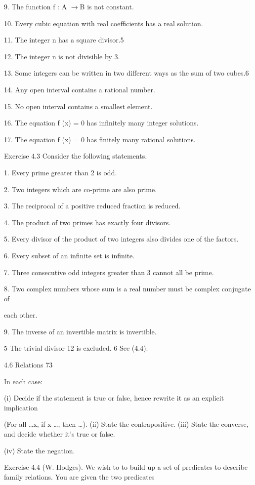 \documentclass[11pt]{article}
\theoremstyle{plain}
\theoremstyle{definition}
\begin{document}
9. The function f : A $\to$B is not constant.

10. Every cubic equation with real coefficients has a real solution.

11. The integer n has a square divisor.5

12. The integer n is not divisible by 3.

13. Some integers can be written in two different ways as the sum of two cubes.6

14. Any open interval contains a rational number.

15. No open interval contains a smallest element.

16. The equation f (x) = 0 has infinitely many integer solutions.

17. The equation f (x) = 0 has finitely many rational solutions.

Exercise 4.3 Consider the following statements.

1. Every prime greater than 2 is odd.

2. Two integers which are co-prime are also prime.

3. The reciprocal of a positive reduced fraction is reduced.

4. The product of two primes has exactly four divisors.

5. Every divisor of the product of two integers also divides one of the factors.

6. Every subset of an infinite set is infinite.

7. Three consecutive odd integers greater than 3 cannot all be prime.

8. Two complex numbers whose sum is a real number must be complex conjugate of

each other.

9. The inverse of an invertible matrix is invertible.

5 The trivial divisor 12 is excluded. 6 See (4.4).

4.6 Relations 73

In each case:

(i) Decide if the statement is true or false, hence rewrite it as an explicit implication

(For all \dots{}x, if x \dots{}, then \dots{}). (ii) State the contrapositive. (iii) State the converse, and decide whether it's true or false.

(iv) State the negation.

Exercise 4.4 (W. Hodges). We wish to to build up a set of predicates to describe family relations. You are given the two predicates
\end{document}
